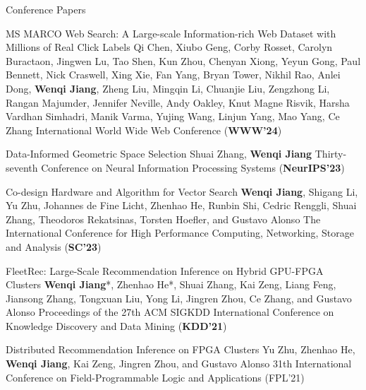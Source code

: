 \begin{rSection}{Conference Papers}
\begin{enumerate}[label={[\arabic*]}]

\item 
\begin{Pub}{MS MARCO Web Search: A Large-scale Information-rich Web Dataset with Millions of Real Click Labels}
{Qi Chen, Xiubo Geng, Corby Rosset, Carolyn Buractaon, Jingwen Lu, Tao Shen, Kun Zhou, Chenyan Xiong, Yeyun Gong, Paul Bennett, Nick Craswell, Xing Xie, Fan Yang, Bryan Tower, Nikhil Rao, Anlei Dong, \textbf{Wenqi Jiang}, Zheng Liu, Mingqin Li, Chuanjie Liu, Zengzhong Li, Rangan Majumder, Jennifer Neville, Andy Oakley, Knut Magne Risvik, Harsha Vardhan Simhadri, Manik Varma, Yujing Wang, Linjun Yang, Mao Yang, Ce Zhang}
{International World Wide Web Conference (\textbf{WWW'24})}
\end{Pub}

\item 
\begin{Pub}{Data-Informed Geometric Space Selection}
{Shuai Zhang, \textbf{Wenqi Jiang}}
{Thirty-seventh Conference on Neural Information Processing Systems (\textbf{NeurIPS'23})}
\end{Pub}

\item 
\begin{Pub}{Co-design Hardware and Algorithm for Vector Search}
{\textbf{Wenqi Jiang}, Shigang Li, Yu Zhu, Johannes de Fine Licht, Zhenhao He, Runbin Shi, Cedric Renggli, Shuai Zhang, Theodoros Rekatsinas, Torsten Hoefler, and Gustavo Alonso}
{The International Conference for High Performance Computing, Networking, Storage and Analysis (\textbf{SC'23})}
\end{Pub}

\item 
\begin{Pub}{FleetRec: Large-Scale Recommendation Inference on Hybrid GPU-FPGA Clusters}
{\textbf{Wenqi Jiang}*, Zhenhao He*, Shuai Zhang, Kai Zeng, Liang Feng, Jiansong Zhang, Tongxuan Liu, Yong Li, Jingren Zhou, Ce Zhang, and Gustavo Alonso}
{Proceedings of the 27th ACM SIGKDD International Conference on Knowledge Discovery and Data Mining (\textbf{KDD'21})}
\end{Pub}

\item 
\begin{Pub}{Distributed Recommendation Inference on FPGA Clusters}
{Yu Zhu, Zhenhao He, \textbf{Wenqi Jiang}, Kai Zeng, Jingren Zhou, and Gustavo Alonso}
{31th International Conference on Field-Programmable Logic and Applications (FPL'21)}
\end{Pub}


\end{enumerate}
\end{rSection}
